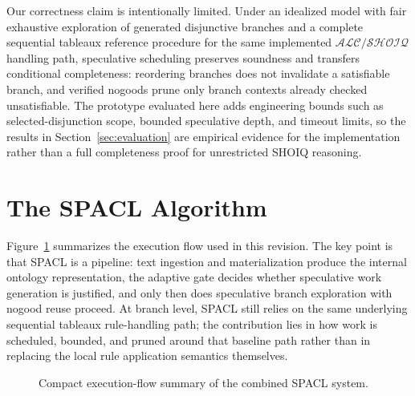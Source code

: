 \documentclass[preprint,12pt,times]{elsarticle}
\newcommand{\dlfrag}{\ensuremath{\mathcal{ALC/SHOIQ}}}
\begin{document}
Our correctness claim is intentionally limited. Under an idealized model with fair exhaustive exploration of generated disjunctive branches and a complete sequential tableaux reference procedure for the same implemented \dlfrag handling path, speculative scheduling preserves soundness and transfers conditional completeness: reordering branches does not invalidate a satisfiable branch, and verified nogoods prune only branch contexts already checked unsatisfiable. The prototype evaluated here adds engineering bounds such as selected-disjunction scope, bounded speculative depth, and timeout limits, so the results in Section~\ref{sec:evaluation} are empirical evidence for the implementation rather than a full completeness proof for unrestricted SHOIQ reasoning.

\section{The SPACL Algorithm}
\label{sec:algorithm}

Figure~\ref{fig:spacl-flow} summarizes the execution flow used in this revision. The key point is that SPACL is a pipeline: text ingestion and materialization produce the internal ontology representation, the adaptive gate decides whether speculative work generation is justified, and only then does speculative branch exploration with nogood reuse proceed.
At branch level, SPACL still relies on the same underlying sequential tableaux rule-handling path; the contribution lies in how work is scheduled, bounded, and pruned around that baseline path rather than in replacing the local rule application semantics themselves.

\begin{figure}[htbp]
\centering
{}
\caption{Compact execution-flow summary of the combined SPACL system.}
\label{fig:spacl-flow}
\end{figure}
\end{document}
